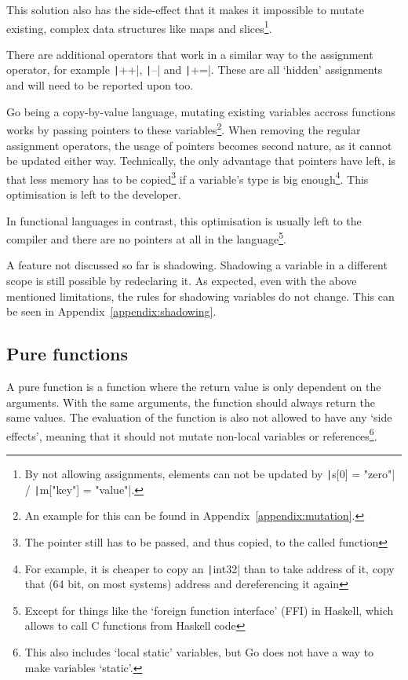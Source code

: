 This solution also has the side-effect that it makes it impossible to mutate
existing, complex data structures like maps and slices\footnote{By not
    allowing assignments, elements can not be updated by
\texttt|s[0] = "zero"| / \texttt|m["key"] = "value"|.}.

There are additional operators that work in a similar way to the assignment
operator, for example \texttt|++|, \texttt|--| and
\texttt|+=|. These are all `hidden' assignments and will need to
be reported upon too.

Go being a \gls{copy-by-value} language, mutating existing variables
accross functions works by passing pointers to these variables\footnote{
An example for this can be found in Appendix~\ref{appendix:mutation}.}.
When removing the regular assignment operators, the usage of pointers becomes
second nature, as it cannot be updated either way.
Technically, the only advantage that pointers have left, is that less memory has
to be copied\footnote{The pointer still has to be passed, and thus copied, to the
called function} if a variable's type is big enough\footnote{For example, it is
	cheaper to copy an \texttt|int32| than to take address of it, copy that
(64 bit, on most systems) address and dereferencing it again}.
This optimisation is left to the developer.

In functional languages in contrast, this optimisation is usually left to the compiler
and there are no pointers at all in the language\footnote{Except for things like the `foreign
function interface' (FFI) in Haskell, which allows to call C functions from Haskell code}.

A feature not discussed so far is shadowing. Shadowing a variable in a different
scope is still possible by redeclaring it. As expected, even with the above
mentioned limitations, the rules for shadowing variables do not change. This
can be seen in Appendix~\ref{appendix:shadowing}.

\subsection{Pure functions}

A pure function is a function where the return value is only dependent on
the arguments. With the same arguments, the function should always return
the same values. The evaluation of the function is also not allowed to have
any `side effects', meaning that it should not mutate non-local variables or
references\footnote{This also includes `local static' variables, but Go does
not have a way to make variables `static'.}.

